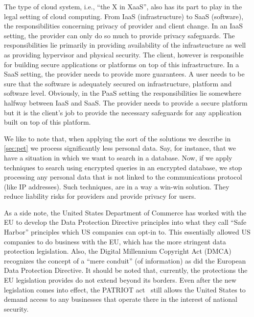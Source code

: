 \documentclass[11pt]{article}
\begin{document}
The type of cloud system, i.e., ``the X in XaaS'', also has its part to play in the legal setting of cloud computing.
From IaaS (infrastructure) to SaaS (software), the responsibilities concerning privacy of provider and client change.
In an IaaS setting, the provider can only do so much to provide privacy safeguards.
The responsibilities lie primarily in providing availability of the infrastructure as well as providing hypervisor and physical security.
The client, however is responsible for building secure applications or platforms on top of this infrastructure.
In a SaaS setting, the provider needs to provide more guarantees.
A user needs to be sure that the software is adequately secured on infrastructure, platform and software level.
Obviously, in the PaaS setting the responsibilities lie somewhere halfway between IaaS and SaaS. The provider needs to provide a secure platform but it is the client's job to provide the necessary safeguards for any application built on top of this platform.

We like to note that, when applying the sort of the solutions we describe in \autoref{sec:pet} we process significantly less personal data. Say, for instance, that we have a situation in which we want to search in a database. Now, if we apply techniques to search using encrypted queries in an encrypted database, we stop processing any personal data that is not linked to the communications protocol (like IP addresses). Such techniques, are in a way a win-win solution. They reduce liability risks for providers and provide privacy for users.

As a side note, the United States Department of Commerce has worked with the EU to develop the Data Protection Directive principles into what they call ``Safe Harbor'' principles which US companies can opt-in to.
This essentially allowed US companies to do business with the EU, which has the more stringent data protection legislation.
Also, the Digital Millennium Copyright Act (DMCA) recognizes the concept of a ``mere conduit'' (of information) as did the European Data Protection Directive. \cite{congress1998digital}
It should be noted that, currently, the protections the EU legislation provides do not extend beyond its borders.
Even after the new legislation comes into effect, the PATRIOT act~\cite{mailman2002uniting} still allows the United States to demand access to any businesses that operate there in the interest of national security.

\end{document}
